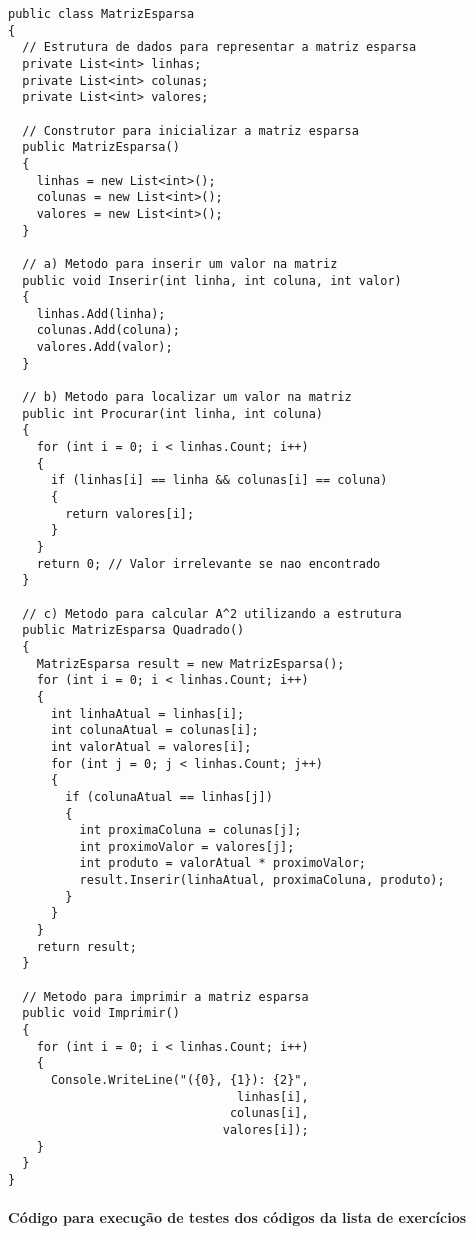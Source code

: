\documentclass[portuguese,12pt,a4paper]{article}
\begin{document}
\lstset{language=C++,
	basicstyle=\footnotesize,	
	numbers=left,
	numberstyle=\footnotesize,
	frame=shadowbox}
\begin{lstlisting} 
public class MatrizEsparsa
{
  // Estrutura de dados para representar a matriz esparsa
  private List<int> linhas;
  private List<int> colunas;
  private List<int> valores;

  // Construtor para inicializar a matriz esparsa
  public MatrizEsparsa()
  {
    linhas = new List<int>();
    colunas = new List<int>();
    valores = new List<int>();
  }

  // a) Metodo para inserir um valor na matriz
  public void Inserir(int linha, int coluna, int valor)
  {
    linhas.Add(linha);
    colunas.Add(coluna);
    valores.Add(valor);
  }

  // b) Metodo para localizar um valor na matriz
  public int Procurar(int linha, int coluna)
  {
    for (int i = 0; i < linhas.Count; i++)
    {
      if (linhas[i] == linha && colunas[i] == coluna)
      {
        return valores[i];
      }
    }
    return 0; // Valor irrelevante se nao encontrado
  }

  // c) Metodo para calcular A^2 utilizando a estrutura
  public MatrizEsparsa Quadrado()
  {
    MatrizEsparsa result = new MatrizEsparsa();
    for (int i = 0; i < linhas.Count; i++)
    {
      int linhaAtual = linhas[i];
      int colunaAtual = colunas[i];
      int valorAtual = valores[i];
      for (int j = 0; j < linhas.Count; j++)
      {
        if (colunaAtual == linhas[j])
        {
          int proximaColuna = colunas[j];
          int proximoValor = valores[j];
          int produto = valorAtual * proximoValor;
          result.Inserir(linhaAtual, proximaColuna, produto);
        }
      }
    }
    return result;
  }

  // Metodo para imprimir a matriz esparsa
  public void Imprimir()
  {
    for (int i = 0; i < linhas.Count; i++)
    {
      Console.WriteLine("({0}, {1}): {2}", 
                                linhas[i], 
                               colunas[i], 
                              valores[i]);
    }
  }
}
\end{lstlisting}


\paragraph{}
\textbf{Código para execução de testes dos códigos da lista de exercícios}\newline\newline
\end{document}
